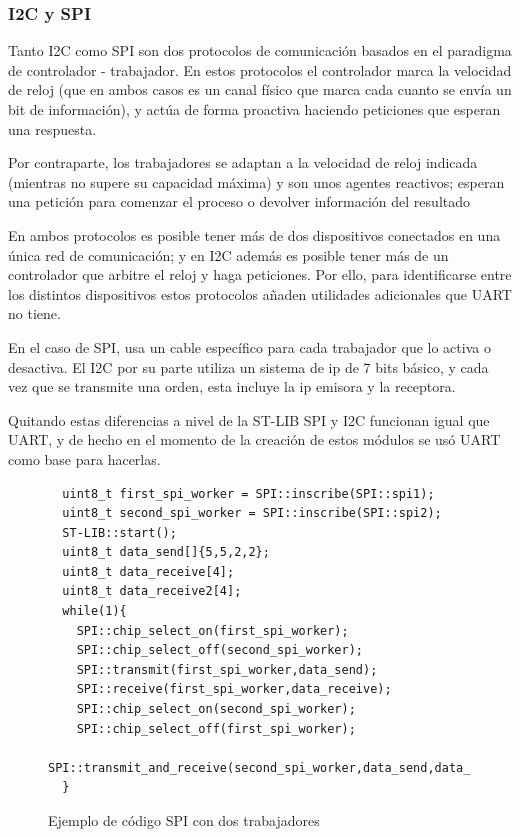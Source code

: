 \documentclass{report}
\begin{document}
\subsubsection{I2C y SPI}
Tanto I2C como SPI son dos protocolos de comunicación basados en el paradigma de controlador - trabajador. En estos protocolos el controlador marca la velocidad de reloj (que en ambos casos es un canal físico que marca cada cuanto se envía un bit de información), y actúa de forma proactiva haciendo peticiones que esperan una respuesta. \par
Por contraparte, los trabajadores se adaptan a la velocidad de reloj indicada (mientras no supere su capacidad máxima) y son unos agentes reactivos; esperan una petición para comenzar el proceso o devolver información del resultado \par \vspace{0.3cm}
En ambos protocolos es posible tener más de dos dispositivos conectados en una única red de comunicación; y en I2C además es posible tener más de un controlador que arbitre el reloj y haga peticiones. Por ello, para identificarse entre los distintos dispositivos estos protocolos añaden utilidades adicionales que UART no tiene. \par
En el caso de SPI, usa un cable específico para cada trabajador que lo activa o desactiva. El I2C por su parte utiliza un sistema de ip de 7 bits básico, y cada vez que se transmite una orden, esta incluye la ip emisora y la receptora. \par \vspace{0.3cm}
Quitando estas diferencias a nivel de la ST-LIB SPI y I2C funcionan igual que UART, y de hecho en el momento de la creación de estos módulos se usó UART como base para hacerlas. \par
\begin{figure}[h]
\begin{lstlisting}
  uint8_t first_spi_worker = SPI::inscribe(SPI::spi1);
  uint8_t second_spi_worker = SPI::inscribe(SPI::spi2);
  ST-LIB::start();
  uint8_t data_send[]{5,5,2,2};
  uint8_t data_receive[4];
  uint8_t data_receive2[4];
  while(1){
    SPI::chip_select_on(first_spi_worker);
    SPI::chip_select_off(second_spi_worker);
    SPI::transmit(first_spi_worker,data_send);
    SPI::receive(first_spi_worker,data_receive);
    SPI::chip_select_on(second_spi_worker);
    SPI::chip_select_off(first_spi_worker);
    SPI::transmit_and_receive(second_spi_worker,data_send,data_receive2);
  }
\end{lstlisting}
\caption{Ejemplo de código SPI con dos trabajadores}
  \label{SPIcode}
\end{figure}
\end{document}
